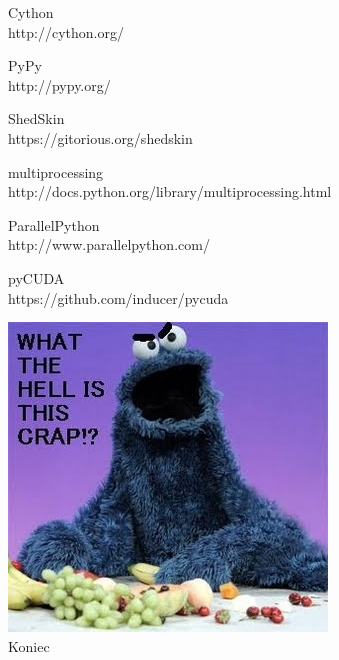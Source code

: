 \documentclass{beamer}
\begin{document}
\begin{frame}
Cython \\
http://cython.org/ \\
\end{frame}

\begin{frame}
PyPy \\
http://pypy.org/ \\
\end{frame}

\begin{frame}
ShedSkin \\
https://gitorious.org/shedskin \\
\end{frame}

\begin{frame}
multiprocessing \\
http://docs.python.org/library/multiprocessing.html \\
\end{frame}

\begin{frame}
ParallelPython \\
http://www.parallelpython.com/ \\
\end{frame}

\begin{frame}
pyCUDA \\
https://github.com/inducer/pycuda \\
\end{frame}

\begin{frame}
\includegraphics[scale=0.5]{cookie_monster.jpg} \\
Koniec
\end{frame}
\end{document}
